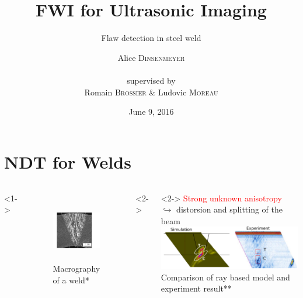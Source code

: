 \documentclass[11pt,xcolor=x11names,compress, notes=show]{beamer}%
\author{Alice \textsc{Dinsenmeyer} \\~\\ supervised by \\ Romain \textsc{Brossier} \& Ludovic \textsc{Moreau}}
\title{FWI for Ultrasonic Imaging}
\subtitle{Flaw detection in steel weld}
\date{\small June 9, 2016}
\begin{document}
\begin{frame}
	\titlepage 
\end{frame}


\section*{NDT for Welds}
\begin{frame}{\insertsectionhead}
\vspace{-1cm}
\hspace{1cm}
	\begin{columns}[c]
			<1->
			\centering
			\begin{figure}
				\includegraphics[height=2.7cm]{./img/soudure1.png}\\
				{\centering \tiny Macrography of a weld*}
			\end{figure}
			<2->
			\hspace{-3cm}
			\vspace{2cm}
			<2->
			\hspace{-1cm}
			\textcolor{red}{Strong unknown anisotropy}\\
			$\hookrightarrow$ distorsion and splitting of the beam\\[0.2cm]
			\hspace{-0.5cm}
			\includegraphics[scale=0.5]{img/gardahaut.png}\\
			{\centering \tiny Comparison of ray based model and experiment result**}
				

\end{columns}
\end{frame}
\end{document}
